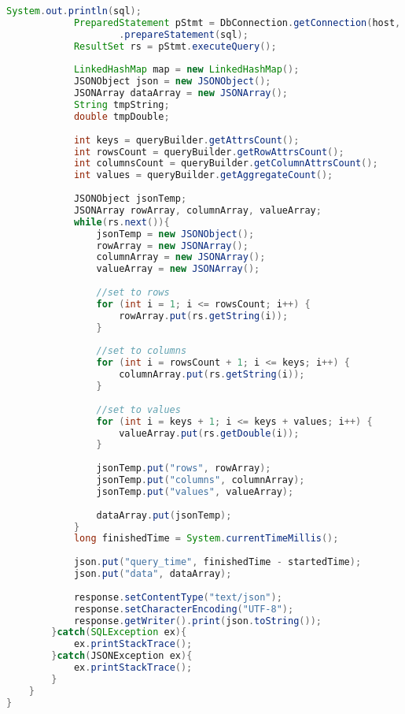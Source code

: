 \begin{lstlisting}[language=Java,basicstyle=\tiny,caption=GeneratorServlet.java]
            System.out.println(sql);
            PreparedStatement pStmt = DbConnection.getConnection(host, user, pass, port, db, driver)
                    .prepareStatement(sql);
            ResultSet rs = pStmt.executeQuery();
            
            LinkedHashMap map = new LinkedHashMap();
            JSONObject json = new JSONObject();
            JSONArray dataArray = new JSONArray();
            String tmpString;
            double tmpDouble;
            
            int keys = queryBuilder.getAttrsCount();
            int rowsCount = queryBuilder.getRowAttrsCount();
            int columnsCount = queryBuilder.getColumnAttrsCount();
            int values = queryBuilder.getAggregateCount();
            
            JSONObject jsonTemp;
            JSONArray rowArray, columnArray, valueArray;
            while(rs.next()){
                jsonTemp = new JSONObject();
                rowArray = new JSONArray();
                columnArray = new JSONArray();
                valueArray = new JSONArray();
                
                //set to rows
                for (int i = 1; i <= rowsCount; i++) {
                    rowArray.put(rs.getString(i));
                }
                
                //set to columns
                for (int i = rowsCount + 1; i <= keys; i++) {
                    columnArray.put(rs.getString(i));
                }
                
                //set to values
                for (int i = keys + 1; i <= keys + values; i++) {
                    valueArray.put(rs.getDouble(i));
                }
                
                jsonTemp.put("rows", rowArray);
                jsonTemp.put("columns", columnArray);
                jsonTemp.put("values", valueArray);
                
                dataArray.put(jsonTemp);
            }
            long finishedTime = System.currentTimeMillis();
            
            json.put("query_time", finishedTime - startedTime);
            json.put("data", dataArray);
            
            response.setContentType("text/json");
            response.setCharacterEncoding("UTF-8");
            response.getWriter().print(json.toString());
        }catch(SQLException ex){
            ex.printStackTrace();
        }catch(JSONException ex){
            ex.printStackTrace();
        }
    }
}
\end{lstlisting}
